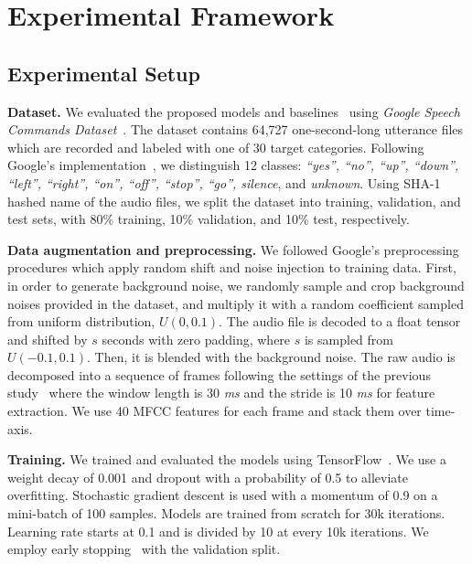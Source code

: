 \documentclass[a4paper]{article}
\begin{document}
\section{Experimental Framework}\label{section:implementation}

\subsection{Experimental Setup} \label{subsection:experimentalsetup}
\textbf{Dataset.}
We evaluated the proposed models and baselines~\cite{sainath-interspeech-2015-cnn, tang-icassp-2018-residual, zhang-arxiv-2017-helloedge} using \emph{Google Speech Commands Dataset}~\cite{googlespeechcommandsv1}.
The dataset contains 64,727 one-second-long utterance files which are recorded and labeled with one of 30 target categories.
Following Google's implementation~\cite{googlespeechcommandsv1}, we distinguish 12 classes: \emph{``yes'', ``no'', ``up'', ``down'', ``left'', ``right'', ``on'', ``off'', ``stop'', ``go'', silence}, and \emph{unknown}.
Using SHA-1 hashed name of the audio files, we split the dataset into training, validation, and test sets, with 80\% training, 10\% validation, and 10\% test, respectively.

\textbf{Data augmentation and preprocessing.}
We followed Google's preprocessing procedures which apply random shift and noise injection to training data.
First, in order to generate background noise, we randomly sample and crop background noises provided in the dataset, and multiply it with a random coefficient sampled from uniform distribution, $U(0, 0.1)$.
The audio file is decoded to a float tensor and shifted by $s$ seconds with zero padding, where $s$ is sampled from $U(-0.1, 0.1)$.
Then, it is blended with the background noise.
The raw audio is decomposed into a sequence of frames following the settings of the previous study~\cite{tang-icassp-2018-residual} where the window length is 30 \emph{ms} and the stride is 10 \emph{ms} for feature extraction.
We use 40 MFCC features for each frame and stack them over time-axis.

\textbf{Training.}
We trained and evaluated the models using TensorFlow~\cite{abadi-osdi-2016-TensorFlow}. 
We use a weight decay of 0.001 and dropout with a probability of 0.5 to alleviate overfitting.
Stochastic gradient descent is used with a momentum of 0.9 on a mini-batch of 100 samples.
Models are trained from scratch for 30k iterations.
Learning rate starts at 0.1 and is divided by 10 at every 10k iterations.
We employ early stopping~\cite{prechelt-springer-1998-earlystop} with the validation split.
\end{document}
